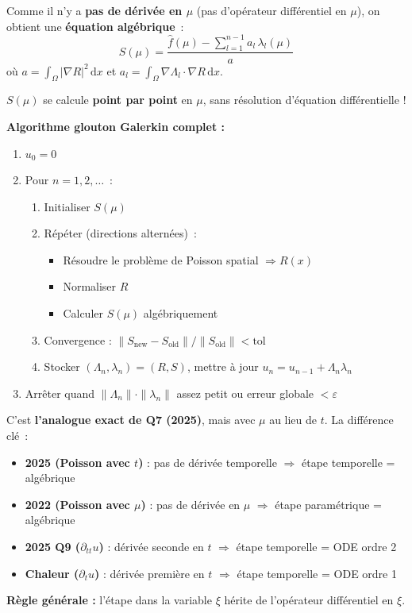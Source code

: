 \documentclass[11pt,a4paper]{article}
\begin{document}
\begin{formulabox}
Comme il n'y a \textbf{pas de d\'eriv\'ee en $\mu$} (pas d'op\'erateur diff\'erentiel en $\mu$), on obtient une \textbf{\'equation alg\'ebrique}~:
\[
\boxed{S(\mu) = \frac{\hat{f}(\mu) - \sum_{l=1}^{n-1} a_l\,\lambda_l(\mu)}{a}}
\]
o\`u $a = \int_\Omega|\nabla R|^2\,\mathrm{d}x$ et $a_l = \int_\Omega\nabla\Lambda_l\cdot\nabla R\,\mathrm{d}x$.

$S(\mu)$ se calcule \textbf{point par point} en $\mu$, sans r\'esolution d'\'equation diff\'erentielle !

\medskip
\textbf{Algorithme glouton Galerkin complet :}
\begin{enumerate}[nosep]
\item $u_0 = 0$
\item Pour $n = 1, 2, \ldots$~:
\begin{enumerate}[nosep,label=(\alph*)]
\item Initialiser $S(\mu)$
\item R\'ep\'eter (directions altern\'ees)~:
\begin{itemize}[nosep]
\item R\'esoudre le probl\`eme de Poisson spatial $\Rightarrow R(x)$
\item Normaliser $R$
\item Calculer $S(\mu)$ alg\'ebriquement
\end{itemize}
\item Convergence : $\|S_\text{new}-S_\text{old}\|/\|S_\text{old}\| < \text{tol}$
\item Stocker $(\Lambda_n, \lambda_n) = (R, S)$, mettre \`a jour $u_n = u_{n-1} + \Lambda_n\lambda_n$
\end{enumerate}
\item Arr\^eter quand $\|\Lambda_n\|\cdot\|\lambda_n\|$ assez petit ou erreur globale $< \varepsilon$
\end{enumerate}
\end{formulabox}

\begin{linkbox}
C'est \textbf{l'analogue exact de Q7 (2025)}, mais avec $\mu$ au lieu de $t$. La diff\'erence cl\'e~:
\begin{itemize}[nosep]
\item \textbf{2025 (Poisson avec $t$)} : pas de d\'eriv\'ee temporelle $\Rightarrow$ \'etape temporelle = alg\'ebrique
\item \textbf{2022 (Poisson avec $\mu$)} : pas de d\'eriv\'ee en $\mu$ $\Rightarrow$ \'etape param\'etrique = alg\'ebrique
\item \textbf{2025 Q9 ($\partial_{tt}u$)} : d\'eriv\'ee seconde en $t$ $\Rightarrow$ \'etape temporelle = ODE ordre 2
\item \textbf{Chaleur ($\partial_t u$)} : d\'eriv\'ee premi\`ere en $t$ $\Rightarrow$ \'etape temporelle = ODE ordre 1
\end{itemize}
\textbf{R\`egle g\'en\'erale :} l'\'etape dans la variable $\xi$ h\'erite de l'op\'erateur diff\'erentiel en $\xi$.
\end{linkbox}
\end{document}
